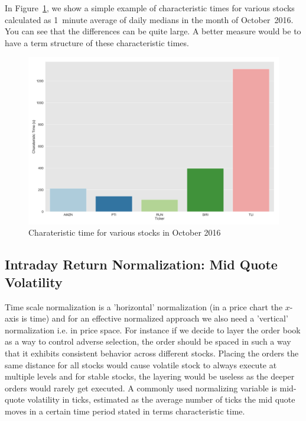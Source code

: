 In Figure~\ref{fig:char_time}, we show a simple example of characteristic times for various stocks calculated as 1~minute average of daily medians in the month of October~2016. You can see that the differences can be quite large. A better measure would be to have a term structure of these characteristic times.

	\begin{figure}[!ht]
	\centering
	\includegraphics[width=\textwidth]{chapters/chapter_trade_data_models/figures/char_time.png} 
	\caption{Charateristic time for various stocks in October 2016 \label{fig:char_time}}
	\end{figure}


\subsection{Intraday Return Normalization: Mid Quote Volatility}

Time scale normalization is a 'horizontal' normalization (in a price chart the $x$-axis is time) and for an effective normalized approach we also need a 'vertical' normalization i.e. in price space. For instance if we decide to layer the order book as a way to control adverse selection, the order should be spaced in such a way that it exhibits consistent behavior across different stocks. Placing the orders the same distance for all stocks would cause volatile stock to always execute at multiple levels and for stable stocks, the layering would be useless as the deeper orders would rarely get executed. A commonly used normalizing variable is mid-quote volatility in ticks, estimated as the average number of ticks the mid quote moves in a certain time period stated in terms characteristic time. 


